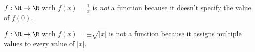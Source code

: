 \documentclass[a4paper]{scrreprt}
\begin{document}
\begin{example}
	$f: \R \rightarrow \R$ with $f(x) = \frac{1}{x}$ is \emph{not} a function because it doesn't specify the value of $f(0)$.

	$f: \R \rightarrow \R$ with $f(x) = \pm \sqrt{|x|}$ is not a function because it assigns multiple values to every value of $|x|$.
\end{example}

	




\end{document}
